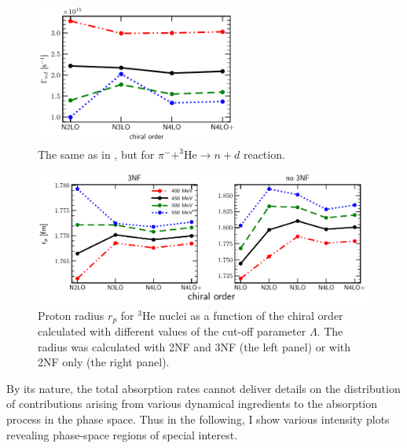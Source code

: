     \begin{figure}[h]
        \begin{center}
        \includegraphics[width=0.6\textwidth]{PlotData/PION/Dalitz_maps/figures/Gamma_nd.pdf}
        \end{center}
        \caption{The same as in , but for $\pi^- + ^3\text{He} \rightarrow n + d$ reaction.}
        \label{Gamma_nd}
    \end{figure}

    \begin{figure}[h]
        \begin{center}
        \includegraphics[width=0.99\textwidth]{PlotData/PION/Dalitz_maps/figures/proton_radius_mt31_3NF.pdf}
        \end{center}
        \caption{ Proton radius $r_p$ for $^3$He nuclei as a function of the chiral order calculated with
        different values of the cut-off parameter $\Lambda$. The radius was calculated with 2NF and 3NF (the left panel)
        or with 2NF only (the right panel).}
        \label{proton_rad}
    \end{figure}


    By its nature, the total absorption rates cannot deliver details
    on the distribution of contributions arising from various dynamical ingredients
    to the absorption process in the phase space. Thus in the following, I show 
    various intensity plots revealing phase-space regions of special interest.

